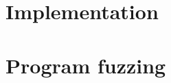 \documentclass[runningheads,a4paper]{llncs}
\begin{document}




 









\section{Implementation}

\section{Program fuzzing}
\end{document}
